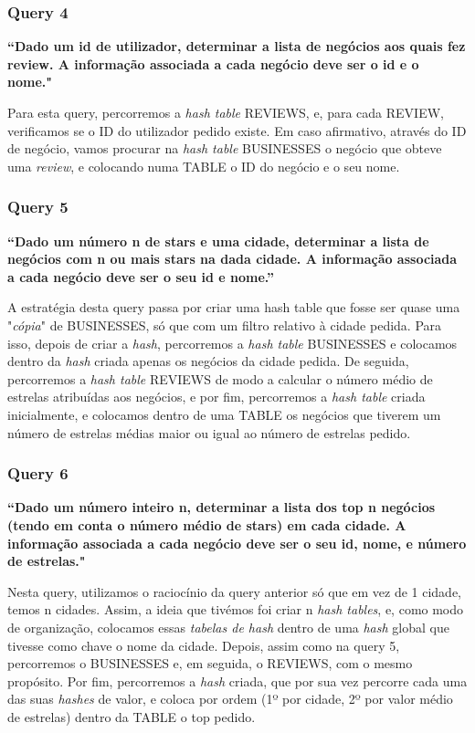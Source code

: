 \documentclass[a4paper]{article}
\begin{document}
\subsubsection*{Query 4}
\label{sec:query4}

\textbf{“Dado um id de utilizador, determinar a lista de negócios aos quais fez review. A
informação associada a cada negócio deve ser o id e o nome."}

Para esta query, percorremos a \textit{hash table} REVIEWS, e, para cada REVIEW, verificamos se o ID do utilizador pedido existe. Em caso afirmativo, através do ID de negócio, vamos procurar na \textit{hash table} BUSINESSES o negócio que obteve uma \textit{review}, e colocando numa TABLE o ID do negócio e o seu nome.


\subsubsection*{Query 5}
\label{sec:query5}

\textbf{“Dado um número n de stars e uma cidade, determinar a lista de negócios com n
ou mais stars na dada cidade. A informação associada a cada negócio deve ser o seu id e
nome.”}

A estratégia desta query passa por criar uma hash table que fosse ser quase uma "\textit{cópia}" de BUSINESSES, só que com um filtro relativo à cidade pedida. Para isso, depois de criar a \textit{hash}, percorremos a \textit{hash table} BUSINESSES e colocamos dentro da \textit{hash} criada apenas os negócios da cidade pedida. De seguida, percorremos a \textit{hash table} REVIEWS de modo a calcular o número médio de estrelas atribuídas aos negócios, e por fim, percorremos a \textit{hash table} criada inicialmente, e colocamos dentro de uma TABLE os negócios que tiverem um número de estrelas médias maior ou igual ao número de estrelas pedido.


\subsubsection*{Query 6}
\label{sec:query6}

\textbf{“Dado um número inteiro n, determinar a lista dos top n negócios (tendo em conta
o número médio de stars) em cada cidade. A informação associada a cada negócio deve
ser o seu id, nome, e número de estrelas."}

Nesta query, utilizamos o raciocínio da query anterior só que em vez de 1 cidade, temos n cidades. Assim, a ideia que tivémos foi criar n \textit{hash tables}, e, como modo de organização, colocamos essas \textit{tabelas de hash} dentro de uma \textit{hash} global que tivesse como chave o nome da cidade. Depois, assim como na query 5, percorremos o BUSINESSES e, em seguida, o REVIEWS, com o mesmo propósito. Por fim, percorremos a \textit{hash} criada, que por sua vez percorre cada uma das suas \textit{hashes} de valor, e coloca por ordem (1º por cidade, 2º por valor médio de estrelas) dentro da TABLE o top pedido.
\end{document}
